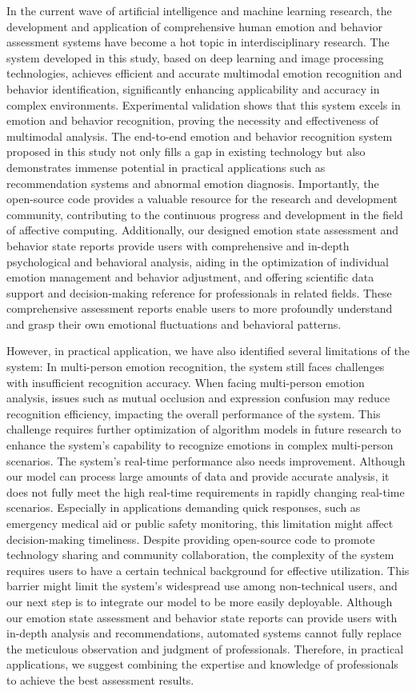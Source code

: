 \documentclass[preprint,12pt]{elsarticle}
\begin{document}
In the current wave of artificial intelligence and machine learning research, the development and application of comprehensive human emotion and behavior assessment systems have become a hot topic in interdisciplinary research. The system developed in this study, based on deep learning and image processing technologies, achieves efficient and accurate multimodal emotion recognition and behavior identification, significantly enhancing applicability and accuracy in complex environments. Experimental validation shows that this system excels in emotion and behavior recognition, proving the necessity and effectiveness of multimodal analysis. The end-to-end emotion and behavior recognition system proposed in this study not only fills a gap in existing technology but also demonstrates immense potential in practical applications such as recommendation systems and abnormal emotion diagnosis. Importantly, the open-source code provides a valuable resource for the research and development community, contributing to the continuous progress and development in the field of affective computing. Additionally, our designed emotion state assessment and behavior state reports provide users with comprehensive and in-depth psychological and behavioral analysis, aiding in the optimization of individual emotion management and behavior adjustment, and offering scientific data support and decision-making reference for professionals in related fields. These comprehensive assessment reports enable users to more profoundly understand and grasp their own emotional fluctuations and behavioral patterns.

However, in practical application, we have also identified several limitations of the system: In multi-person emotion recognition, the system still faces challenges with insufficient recognition accuracy. When facing multi-person emotion analysis, issues such as mutual occlusion and expression confusion may reduce recognition efficiency, impacting the overall performance of the system. This challenge requires further optimization of algorithm models in future research to enhance the system's capability to recognize emotions in complex multi-person scenarios. The system's real-time performance also needs improvement. Although our model can process large amounts of data and provide accurate analysis, it does not fully meet the high real-time requirements in rapidly changing real-time scenarios. Especially in applications demanding quick responses, such as emergency medical aid or public safety monitoring, this limitation might affect decision-making timeliness. Despite providing open-source code to promote technology sharing and community collaboration, the complexity of the system requires users to have a certain technical background for effective utilization. This barrier might limit the system's widespread use among non-technical users, and our next step is to integrate our model to be more easily deployable. Although our emotion state assessment and behavior state reports can provide users with in-depth analysis and recommendations, automated systems cannot fully replace the meticulous observation and judgment of professionals. Therefore, in practical applications, we suggest combining the expertise and knowledge of professionals to achieve the best assessment results.
\end{document}
